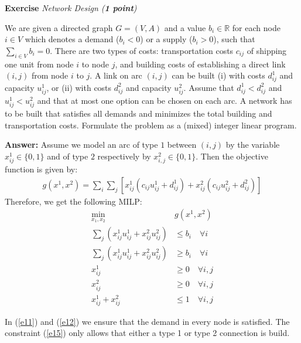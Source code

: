 \documentclass[a4paper,10pt]{article}
\newcounter{exc}
\newenvironment{exercise}[1]%
{\refstepcounter{exc}\textbf{Exercise \arabic{exc}} \emph{#1}\\}
{

\hrulefill\medskip}%
\newcommand{\R}{\mathbb{R}}
\begin{document}
\begin{exercise}{Network Design (\textbf{1 point})}\label{ex:nd1}

We are given a directed graph $G=(V,A)$ and a value $b_i \in \R$ for each node $i\in V$ which denotes a demand ($b_i < 0$) or a supply ($b_i > 0$), such that $\sum_{i\in V} b_i=0$. 
There are two types of costs: transportation costs $c_{ij}$ of shipping one unit from node $i$ to node $j$, and building costs of establishing a direct link $(i,j)$ from node $i$ to $j$. 
A link on arc $(i,j)$ can be built (i) with costs $d_{ij}^1$ and capacity $u_{ij}^1$, or (ii) with costs $d_{ij}^2$ and capacity $u_{ij}^2$. Assume that $d_{ij}^1<d_{ij}^2$ and $u_{ij}^1<u_{ij}^2$ and that at most one option can be chosen on each arc. 
A network has to be built that satisfies all demands and minimizes the total building and transportation costs. Formulate the problem as a (mixed) integer linear program. 

\textbf{Answer:}
Assume we model an arc of type $1$ between $(i,j)$ by the variable $x^1_{ij}\in\{0,1\}$ and of type $2$ respectively by $x^2_{i,j}\in\{0,1\}$. Then the objective function is given by:
\begin{align}
g(x^1,x^2) = \sum\limits_i \sum\limits_j \left[x^1_{ij}(c_{ij} u^1_{ij}+d^1_{ij}) + x^2_{ij}(c_{ij} u^2_{ij}+d^2_{ij}) \right]
\end{align}
Therefore, we get the following MILP:
\begin{align}
\min_{x_1,x_2} & g(x^1,x^2) \\
\sum_j (x^1_{ij}u^1_{ij} + x^2_{ij}u^2_{ij}) & \leq b_i \quad \forall i \label{e11}\\
\sum_j (x^1_{ij}u^1_{ij} + x^2_{ij}u^2_{ij}) & \geq b_i \quad \forall i \label{e12}\\
x^1_{ij} & \geq 0 \quad \forall i,j \label{e13}\\ x^2_{ij} & \geq 0 \quad \forall i,j \label{e14}\\
x^1_{ij}+ x^2_{ij} & \leq 1 \quad \forall i,j \label{e15}
\end{align}

In (\ref{e11}) and (\ref{e12}) we ensure that the demand in every node is satisfied. The constraint (\ref{e15}) only allows that either a type 1 or type 2 connection is build.

\end{exercise}
\end{document}

